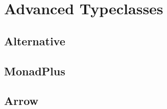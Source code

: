 
\chapter{Advanced Typeclasses}

\section{Alternative}

\blindtext%

\section{MonadPlus}

\blindtext%

\section{Arrow}

\blindtext%
